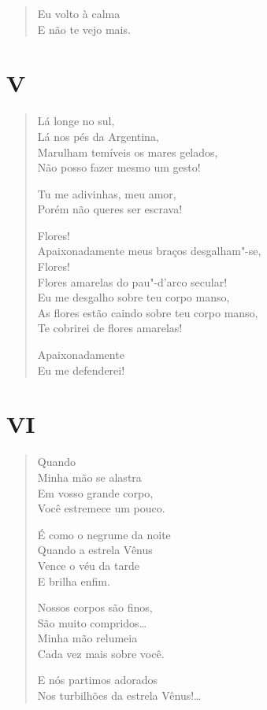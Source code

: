 {\begin{verse}
Eu volto à calma\\
E não te vejo mais.
\end{verse}

\pagebreak
\section*{V}

\begin{verse}
Lá longe no sul,\\
Lá nos pés da Argentina,\\
Marulham temíveis os mares gelados,\\
Não posso fazer mesmo um gesto!

Tu me adivinhas, meu amor,\\
Porém não queres ser escrava!

Flores!\\
Apaixonadamente meus braços desgalham"-se,\\
Flores!\\
Flores amarelas do pau"-d'arco secular!\\
Eu me desgalho sobre teu corpo manso,\\
As flores estão caindo sobre teu corpo manso,\\
Te cobrirei de flores amarelas!

Apaixonadamente\\
Eu me defenderei!
\end{verse}

\pagebreak
\section*{VI}

\begin{verse}
Quando\\
Minha mão se alastra\\
Em vosso grande corpo,\\
Você estremece um pouco.

É como o negrume da noite\\
Quando a estrela Vênus\\
Vence o véu da tarde\\
E brilha enfim.

Nossos corpos são finos,\\
São muito compridos\ldots{}\\
Minha mão relumeia\\
Cada vez mais sobre você.

E nós partimos adorados\\
Nos turbilhões da estrela Vênus!\ldots{}
\end{verse}

}
